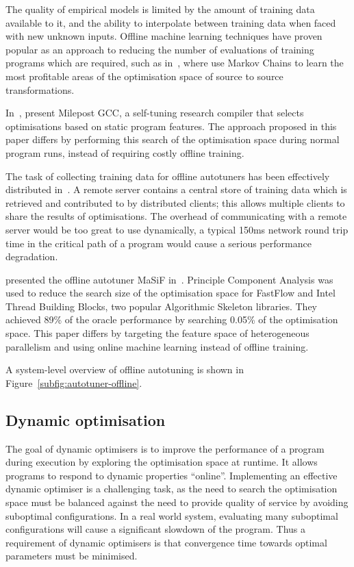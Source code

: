 The quality of empirical models is limited by the amount of training
data available to it, and the ability to interpolate between training
data when faced with new unknown inputs. Offline machine learning
techniques have proven popular as an approach to reducing the number
of evaluations of training programs which are required, such as
in~\cite{Agakov}, where \citeauthor{Agakov} use Markov Chains to learn
the most profitable areas of the optimisation space of source to
source transformations.

In~\cite{Fursin2011}, \citeauthor{Fursin2011} present Milepost GCC, a
self-tuning research compiler that selects optimisations based on
static program features. The approach proposed in this paper differs by
performing this search of the optimisation space during normal program
runs, instead of requiring costly offline training.

The task of collecting training data for offline autotuners has been
effectively distributed in~\cite{Fursin2014, Auler2014}. A remote
server contains a central store of training data which is retrieved
and contributed to by distributed clients; this allows multiple
clients to share the results of optimisations. The overhead of
communicating with a remote server would be too great to use
dynamically, a typical 150ms network round trip time in the critical
path of a program would cause a serious performance degradation.

\citeauthor{Collins2013} presented the offline autotuner MaSiF
in~\cite{Collins2013}. Principle Component Analysis was used to reduce
the search size of the optimisation space for FastFlow and Intel
Thread Building Blocks, two popular Algorithmic Skeleton
libraries. They achieved 89\% of the oracle performance by searching
0.05\% of the optimisation space. This paper differs by targeting the
feature space of heterogeneous parallelism and using online machine
learning instead of offline training.

A system-level overview of offline autotuning is shown in
Figure~\ref{subfig:autotuner-offline}.

\subsection{Dynamic optimisation}\label{subsec:dynamic-optimisation}
The goal of dynamic optimisers is to improve the performance of a
program during execution by exploring the optimisation space at
runtime. It allows programs to respond to dynamic properties
``online''. Implementing an effective dynamic optimiser is a
challenging task, as the need to search the optimisation space must be
balanced against the need to provide quality of service by avoiding
suboptimal configurations. In a real world system, evaluating many
suboptimal configurations will cause a significant slowdown of the
program. Thus a requirement of dynamic optimisers is that convergence
time towards optimal parameters must be minimised.

